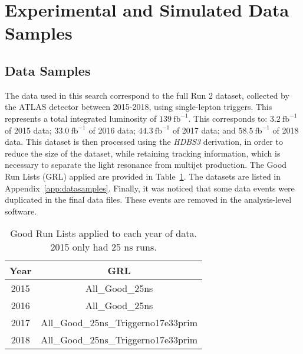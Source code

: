 \documentclass[NOTE, atlasdraft=true, texlive=2017, UKenglish]{\ATLASLATEXPATH atlasdoc}
\begin{document}
\clearpage
\section{Experimental and Simulated Data Samples}
\label{sec:samples}

\subsection{Data Samples}
\label{sec:datasamples}

The data used in this search correspond to the full Run 2 dataset, collected by the ATLAS detector between 2015-2018, using single-lepton triggers. This represents a total integrated luminosity of $139\ \text{fb}^{-1}$. This corresponds to: $3.2\ \text{fb}^{-1}$ of 2015 data; $33.0\ \text{fb}^{-1}$ of 2016 data; $44.3\ \text{fb}^{-1}$ of 2017 data; and $58.5\ \text{fb}^{-1}$ of 2018 data. This dataset is then processed using the \emph{HDBS3} derivation, in order to reduce the size of the dataset, while retaining tracking information, which is necessary to separate the light resonance from multijet production. The Good Run Lists (GRL) applied are provided in Table~\ref{tab:grls}. The datasets are listed in Appendix~\ref{app:datasamples}. Finally, it was noticed that some data events were duplicated in the final data files. These events are removed in the analysis-level software.

\begin{table}[!htbp]{\footnotesize\renewcommand{\arraystretch}{1.2}
    \begin{center}
      \begin{tabular}{|c|c|}
        \hline
        Year & GRL\\
        \hline
        2015 & All\_Good\_25ns \\
        2016 & All\_Good\_25ns \\
        2017 & All\_Good\_25ns\_Triggerno17e33prim \\
        2018 & All\_Good\_25ns\_Triggerno17e33prim \\
        \hline
      \end{tabular}
      \caption{Good Run Lists applied to each year of data. 2015 only had 25 ns runs.}
      \label{tab:grls}
  \end{center}}
\end{table}
\end{document}
